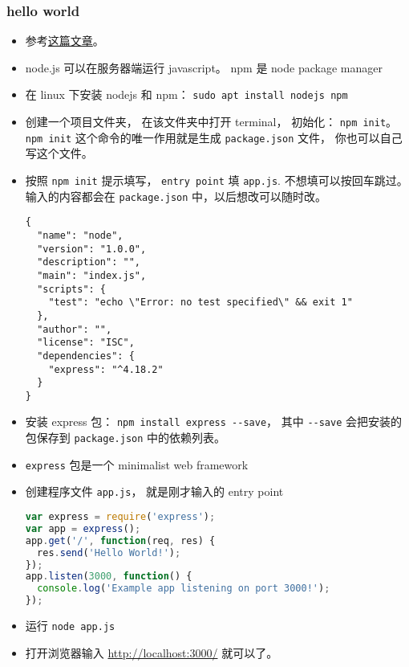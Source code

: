 
\begin{issues}
\issueDraft
\end{issues}


\subsubsection{hello world}
\begin{itemize}
\item 参考\href{https://medium.com/@adnanrahic/hello-world-app-with-node-js-and-express-c1eb7cfa8a30}{这篇文章}。
\item node.js 可以在服务器端运行 javascript。 npm 是 node package manager
\item 在 linux 下安装 nodejs 和 npm： \verb|sudo apt install nodejs npm|
\item 创建一个项目文件夹， 在该文件夹中打开 terminal， 初始化： \verb|npm init|。 \verb|npm init| 这个命令的唯一作用就是生成 \verb`package.json` 文件， 你也可以自己写这个文件。
\item 按照 \verb|npm init| 提示填写， \verb|entry point| 填 \verb`app.js`. 不想填可以按回车跳过。 输入的内容都会在 \verb|package.json| 中，以后想改可以随时改。
\begin{lstlisting}[language=none,caption=package.json 示例]
{
  "name": "node",
  "version": "1.0.0",
  "description": "",
  "main": "index.js",
  "scripts": {
    "test": "echo \"Error: no test specified\" && exit 1"
  },
  "author": "",
  "license": "ISC",
  "dependencies": {
    "express": "^4.18.2"
  }
}
\end{lstlisting}
\item 安装 express 包： \verb|npm install express --save|， 其中 \verb|--save| 会把安装的包保存到 \verb|package.json| 中的依赖列表。
\item \verb|express| 包是一个 minimalist web framework
\item 创建程序文件 \verb|app.js|， 就是刚才输入的 entry point
\begin{lstlisting}[language=js]
var express = require('express');
var app = express();
app.get('/', function(req, res) {
  res.send('Hello World!');
});
app.listen(3000, function() {
  console.log('Example app listening on port 3000!');
});
\end{lstlisting}
\item 运行 \verb|node app.js|
\item 打开浏览器输入 \href{http://localhost:3000/}{http://localhost:3000/} 就可以了。
\end{itemize}
